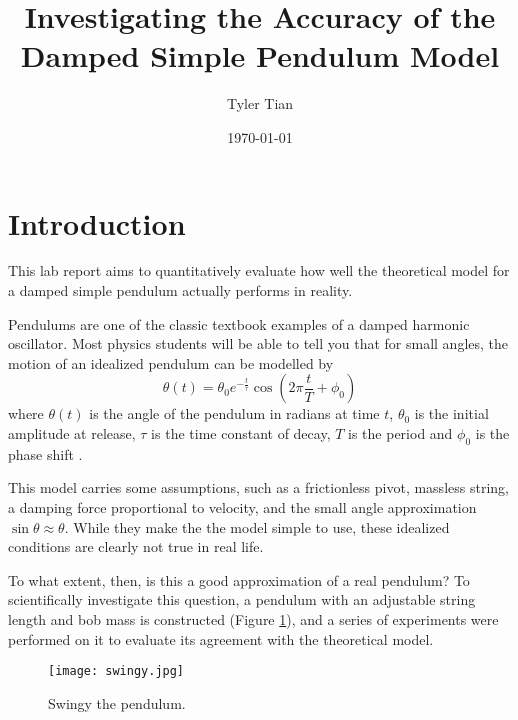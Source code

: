 \documentclass[aps,twocolumn,secnumarabic,nobalancelastpage,amsmath,amssymb,nofootinbib,floatfix,letterpaper]{revtex4}
\begin{document}
\title{Investigating the Accuracy of the Damped Simple Pendulum Model}
\author{Tyler Tian}
\noaffiliation
\date{\today}



\maketitle


\section{Introduction}

This lab report aims to quantitatively evaluate how well the theoretical model for a damped simple pendulum actually
performs in reality.

Pendulums are one of the classic textbook examples of a damped harmonic oscillator. Most physics students will be able
to tell you that for small angles, the motion of an idealized pendulum can be modelled by
\begin{equation}
    \theta(t) = \theta_0 e^{-\frac{t}{\tau}}\cos\left(2\pi\frac{t}{T} + \phi_0\right)
    \label{eqn:model}
\end{equation}
where \(\theta(t)\) is the angle of the pendulum in radians at time \(t\), \(\theta_0\) is the initial amplitude at
release, \(\tau\) is the time constant of decay, \(T\) is the period and \(\phi_0\) is the phase shift \cite{lab}.

This model carries some assumptions, such as a frictionless pivot, massless string, a damping force
proportional to velocity, and the small angle approximation \(\sin \theta \approx \theta\). While they make the
the model simple to use, these idealized conditions are clearly not true in real life.

To what extent, then, is this a good approximation of a real pendulum? To scientifically investigate this question, a
pendulum with an adjustable string length and bob mass is constructed (Figure \ref{fig:swingy}), and a series of
experiments were performed on it to evaluate its agreement with the theoretical model.

\begin{figure}[htb]
    \centering
    \texttt{[image: swingy.jpg]}
    \caption{Swingy the pendulum.}
    \label{fig:swingy}
\end{figure}
\end{document}
